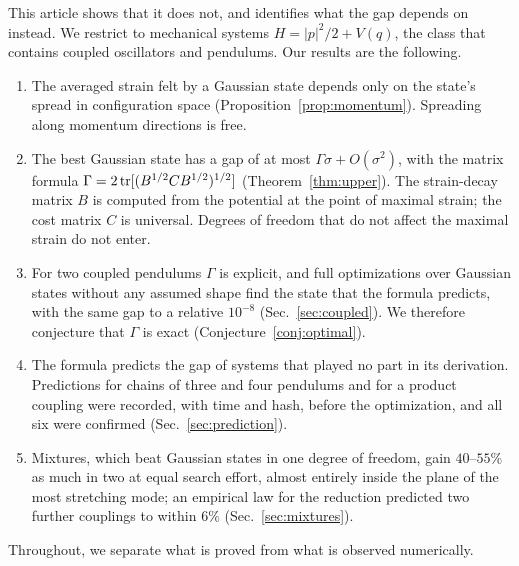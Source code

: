 This article shows that it does not, and identifies what the gap depends on instead. We restrict to mechanical systems $H = |p|^2/2 + V(q)$, the class that contains coupled oscillators and pendulums. Our results are the following.
\begin{enumerate}
\item The averaged strain felt by a Gaussian state depends only on the state's spread in configuration space (Proposition~\ref{prop:momentum}). Spreading along momentum directions is free.
\item The best Gaussian state has a gap of at most $\Gamma\sigma + O(\sigma^2)$, with the matrix formula $\Gamma = 2\operatorname{tr}[(B^{1/2}CB^{1/2})^{1/2}]$ (Theorem~\ref{thm:upper}). The strain-decay matrix $B$ is computed from the potential at the point of maximal strain; the cost matrix $C$ is universal. Degrees of freedom that do not affect the maximal strain do not enter.
\item For two coupled pendulums $\Gamma$ is explicit, and full optimizations over Gaussian states without any assumed shape find the state that the formula predicts, with the same gap to a relative $10^{-8}$ (Sec.~\ref{sec:coupled}). We therefore conjecture that $\Gamma$ is exact (Conjecture~\ref{conj:optimal}).
\item The formula predicts the gap of systems that played no part in its derivation. Predictions for chains of three and four pendulums and for a product coupling were recorded, with time and hash, before the optimization, and all six were confirmed (Sec.~\ref{sec:prediction}).
\item Mixtures, which beat Gaussian states in one degree of freedom, gain $40$--$55\%$ as much in two at equal search effort, almost entirely inside the plane of the most stretching mode; an empirical law for the reduction predicted two further couplings to within $6\%$ (Sec.~\ref{sec:mixtures}).
\end{enumerate}
Throughout, we separate what is proved from what is observed numerically.
